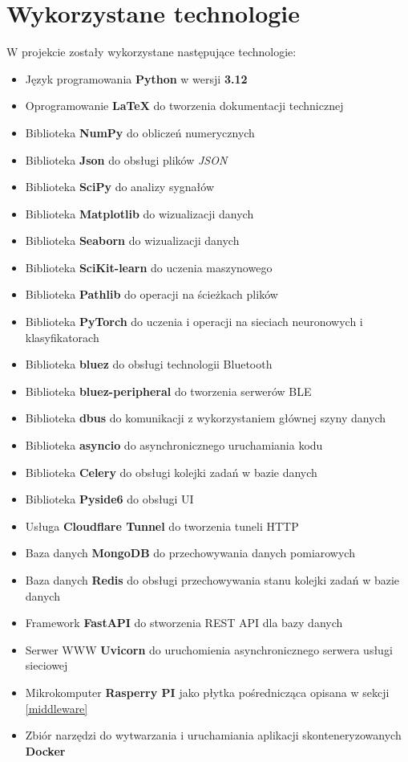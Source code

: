 	\section{Wykorzystane technologie}
	W projekcie zostały wykorzystane następujące technologie:
	\begin{itemize}
		\item Język programowania \textbf{Python} w wersji \textbf{3.12}
		\item Oprogramowanie \textbf{LaTeX} do tworzenia dokumentacji technicznej
		\item Biblioteka \textbf{NumPy} do obliczeń numerycznych
		\item Biblioteka \textbf{Json} do obsługi plików \textit{JSON}
		\item Biblioteka \textbf{SciPy} do analizy sygnałów
		\item Biblioteka \textbf{Matplotlib} do wizualizacji danych
		\item Biblioteka \textbf{Seaborn} do wizualizacji danych
		\item Biblioteka \textbf{SciKit-learn} do uczenia maszynowego
		\item Biblioteka \textbf{Pathlib} do operacji na ścieżkach plików
		\item Biblioteka \textbf{PyTorch} do uczenia i operacji na sieciach neuronowych i klasyfikatorach
		\item Biblioteka \textbf{bluez} do obsługi technologii Bluetooth
		\item Biblioteka \textbf{bluez-peripheral} do tworzenia serwerów BLE
		\item Biblioteka \textbf{dbus} do komunikacji z wykorzystaniem głównej szyny danych
		\item Biblioteka \textbf{asyncio} do asynchronicznego uruchamiania kodu
		\item Biblioteka \textbf{Celery} do obsługi kolejki zadań w bazie danych
		\item Biblioteka \textbf{Pyside6} do obsługi UI
		\item Usługa \textbf{Cloudflare Tunnel} do tworzenia tuneli HTTP
		\item Baza danych \textbf{MongoDB} do przechowywania danych pomiarowych
		\item Baza danych \textbf{Redis} do obsługi przechowywania stanu kolejki zadań w bazie danych
		\item Framework \textbf{FastAPI} do stworzenia REST API dla bazy danych
		\item Serwer WWW \textbf{Uvicorn} do uruchomienia asynchronicznego serwera usługi sieciowej
		\item Mikrokomputer \textbf{Rasperry PI} jako płytka pośrednicząca opisana w sekcji \ref{middleware}
		\item Zbiór narzędzi do wytwarzania i uruchamiania aplikacji skonteneryzowanych \textbf{Docker}
	\end{itemize}

